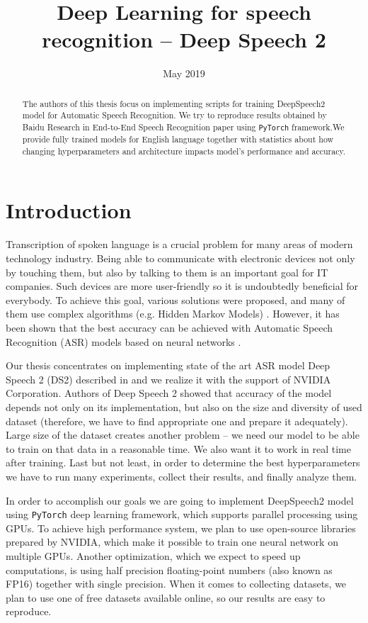 \documentclass[licencjacka,en]{pracamgr}
\title{Deep Learning for speech recognition -- Deep Speech 2}
\date{May 2019}
\begin{document}
\maketitle

\begin{abstract}
  The authors of this thesis focus on implementing scripts for training DeepSpeech2 model for Automatic Speech Recognition. We try to reproduce results obtained by Baidu Research in End-to-End Speech Recognition paper \cite{DS2} using \texttt{PyTorch} framework.We provide fully trained models for English language together with statistics about how changing hyperparameters and architecture impacts model's performance and accuracy.
\end{abstract}

\tableofcontents

\chapter*{Introduction}
Transcription of spoken language is a crucial problem for many areas of modern technology industry. Being able to communicate with electronic devices not only by touching them, but also by talking to them is an important goal for IT companies. Such devices are more user-friendly so it is undoubtedly beneficial for everybody. To achieve this goal, various solutions were proposed, and many of them use complex algorithms (e.g. Hidden Markov Models) \cite{DS1}. However, it has been shown that the best accuracy can be achieved with Automatic Speech Recognition (ASR) models based on neural networks \cite{DS2}.

Our thesis concentrates on implementing state of the art ASR model Deep Speech 2 (DS2) described in \cite{DS2} and we realize it with the support of NVIDIA Corporation. Authors of Deep Speech 2 showed that accuracy of the model depends not only on its implementation, but also on the size and diversity of used dataset (therefore, we have to find appropriate one and prepare it adequately). Large size of the dataset creates another problem -- we need our model to be able to train on that data in a reasonable time. We also want it to work in real time after training. Last but not least, in order to determine the best hyperparameters we have to run many experiments, collect their results, and finally analyze them.

In order to accomplish our goals we are going to implement DeepSpeech2 model using \texttt{PyTorch} deep learning framework, which supports parallel processing using GPUs. To achieve high performance system, we plan to use open-source libraries prepared by NVIDIA, which make it possible to train one neural network on multiple GPUs. Another optimization, which we expect to speed up computations, is using half precision floating-point numbers (also known as FP16) together with single precision. When it comes to collecting datasets, we plan to use one of free datasets available online, so our results are easy to reproduce.
\end{document}
